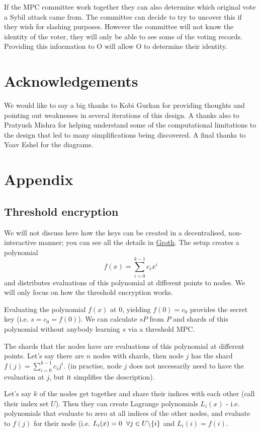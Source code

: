 \documentclass{article}
\begin{document}
If the MPC committee work together they can also determine which original vote a Sybil attack came from. The committee can decide to try to uncover this if they wish for slashing purposes. However the committee will not know the identity of the voter, they will only be able to see some of the voting records. Providing this information to O will allow O to determine their identity.

\section{Acknowledgements}
We would like to say a big thanks to Kobi Gurkan for providing thoughts and pointing out weaknesses in several iterations of this design. A thanks also to Pratyush Mishra for helping understand some of the computational limitations to the design that led to many simplifications being discovered. A final thanks to Yoav Eshel for the diagrams.

\section{Appendix}
\subsection{Threshold encryption}
We will not discuss here how the keys can be created in a decentralised, non-interactive manner; you can see all the details in \href{https://eprint.iacr.org/2021/339.pdf}{Groth}. The setup creates a polynomial 
$$f(x) = \sum_{i=0}^{k-1}c_ix^i$$ and distributes evaluations of this polynomial at different points to nodes. We will only focus on how the threshold encryption works.

Evaluating the polynomial $f(x)$ at $0$, yielding $f(0) = c_0$ provides the secret key (i.e. $s = c_0 = f(0)$). We can calculate $sP$ from $P$ and shards of this polynomial without anybody learning $s$ via a threshold MPC.

The shards that the nodes have are evaluations of this polynomial at different points. Let's say there are $n$ nodes with shards, then node $j$ has the shard $f(j) = \sum_{i=0}^{k-1}c_ij^i$. (in practise, node $j$ does not necessarily need to have the evaluation at $j$, but it simplifies the description).

Let's say $k$ of the nodes get together and share their indices with each other (call their index set $U$). Then they can create Lagrange polynomials $L_i(x)$ - i.e. polynomials that evaluate to zero at all indices of the other nodes, and evaluate to $f(j)$ for their node (i.e. $L_i(x) = 0 \hspace{2mm} \forall j \in U\backslash\{i\}$ and $L_i(i) = f(i)$.
\end{document}
